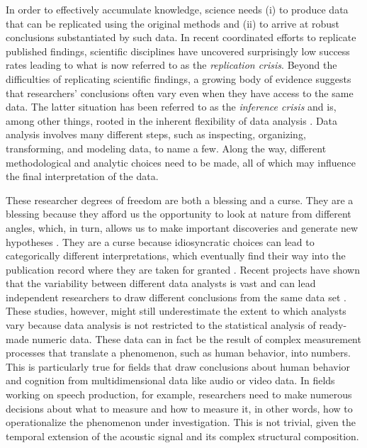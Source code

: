 \documentclass[Review,times,sageh]{sagej}
\begin{document}
In order to effectively accumulate knowledge, science needs (i) to produce data that can be replicated using the original methods and (ii) to arrive at robust conclusions substantiated by such data.
In recent coordinated efforts to replicate published findings, scientific disciplines have uncovered surprisingly low success rates \citep[e.g.,][]{open2015estimating, camerer2018evaluating} leading to what is now referred to as the \emph{replication crisis}.
Beyond the difficulties of replicating scientific findings, a growing body of evidence suggests that researchers' conclusions often vary even when they have access to the same data.
The latter situation has been referred to as the \emph{inference crisis} \citep{rotello2015more, starns2019assessing} and is, among other things, rooted in the inherent flexibility of data analysis \citep[often referred to as researcher degrees of freedom:][]{simmons2011false, gelman2014statistical}.
Data analysis involves many different steps, such as inspecting, organizing, transforming, and modeling data, to name a few.
Along the way, different methodological and analytic choices need to be made, all of which may influence the final interpretation of the data.

These researcher degrees of freedom are both a blessing and a curse.
They are a blessing because they afford us the opportunity to look at nature from different angles, which, in turn, allows us to make important discoveries and generate new hypotheses \citep[e.g.,][]{box1976science, tukey1977exploratory, de2014thought}.
They are a curse because idiosyncratic choices can lead to categorically different interpretations, which eventually find their way into the publication record where they are taken for granted \citep{simmons2011false}.
Recent projects have shown that the variability between different data analysts is vast and can lead independent researchers to draw different conclusions from the same data set \citep[e.g.,][]{silberzahn2018many, starns2019assessing, botvinik-nezer2020}.
These studies, however, might still underestimate the extent to which analysts vary because data analysis is not restricted to the statistical analysis of ready-made numeric data.
These data can in fact be the result of complex measurement processes that translate a phenomenon, such as human behavior, into numbers.
This is particularly true for fields that draw conclusions about human behavior and cognition from multidimensional data like audio or video data.
In fields working on speech production, for example, researchers need to make numerous decisions about what to measure and how to measure it, in other words, how to operationalize the phenomenon under investigation.
This is not trivial, given the temporal extension of the acoustic signal and its complex structural composition.
\end{document}
